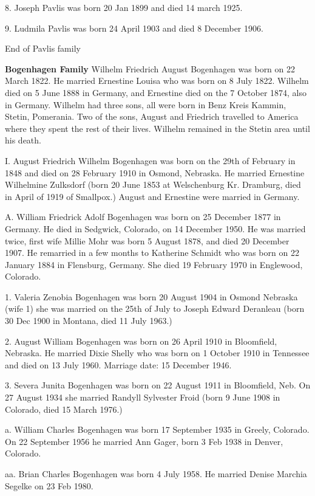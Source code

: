 \documentclass[a4paper]{article}
\begin{document}
8. Joseph Pavlis was born 20 Jan 1899 and died 14 march 1925.

9. Ludmila Pavlis was born 24 April 1903 and died 8 December 1906.  

\vskip 4mm
End of Pavlis family
\pagebreak

{\noindent \Huge \bf Bogenhagen Family}
\vskip 6mm
	Wilhelm Friedrich August Bogenhagen was born on 22 March 1822.  He married Ernestine Louisa who was born on 8 July 1822.  Wilhelm died on 5 June 1888 in Germany, and Ernestine died on the 7 October 1874, also in Germany.  Wilhelm had three sons, all were born in Benz Kreis Kammin, Stetin, Pomerania.   Two of the sons, August and Friedrich travelled to America where they spent the rest of their lives. Wilhelm remained in the Stetin area until his death.

I. August Friedrich Wilhelm Bogenhagen was born on the 29th of February in 1848 and died on 28 February 1910 in Osmond, Nebraska.  He married Ernestine Wilhelmine Zulksdorf  (born 20 June 1853 at Welschenburg Kr. Dramburg, died in April of 1919 of Smallpox.)  August and Ernestine were married in Germany.  

A. William Friedrick Adolf Bogenhagen was born on 25 December 1877 in Germany. He died in Sedgwick, Colorado, on 14 December 1950.  He was married twice, first wife Millie Mohr was born 5 August 1878, and died 20 December 1907.  He remarried in a few months to  Katherine Schmidt who was born on 22 January 1884 in Flensburg, Germany. She died 19 February 1970 in Englewood, Colorado.
		
1. Valeria Zenobia Bogenhagen was born 20 August 1904 in Osmond Nebraska (wife 1) she was married on the 25th of July to Joseph Edward Deranleau (born 30 Dec 1900 in Montana, died 11 July 1963.)

2. August William Bogenhagen was born on 26 April 1910 in Bloomfield, Nebraska.  He married Dixie Shelly who was born on 1 October 1910 in Tennessee and died on 13 July 1960.  Marriage date: 15 December 1946.

3. Severa Junita Bogenhagen was born on 22 August 1911 in Bloomfield, Neb. On 27 August 1934 she married Randyll Sylvester Froid (born 9 June 1908 in Colorado, died 15 March 1976.)  

a. William Charles Bogenhagen was born 17 September 1935 in Greely, Colorado.  On 22 September 1956 he married Ann Gager, born 3 Feb 1938 in Denver, Colorado.
		
aa. Brian Charles Bogenhagen was born 4 July 1958.  He married Denise Marchia Segelke on 23 Feb 1980.
\end{document}
